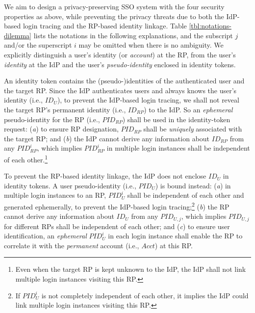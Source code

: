 We aim to design a privacy-preserving SSO system with the four security properties as above,
    while preventing the privacy threats due to both the IdP-based login tracing and the RP-based identity linkage.
Table \ref{tbl:notations-dilemma} lists the notations in the following explanations,
    and the subscript $j$ and/or the superscript $i$ may be omitted when there is no ambiguity.
We explicitly distinguish a user's identity (or \emph{account}) at the RP, 
     from the user's \emph{identity} at the IdP and the user's \emph{pseudo-identity} enclosed in identity tokens.

An identity token contains the (pseudo-)identities of the authenticated user and the target RP. %
Since the IdP authenticates users and always knows the user's identity (i.e., $ID_U$),
    to prevent the IdP-based login tracing,
    we shall not reveal the target RP's permanent identity (i.e., $ID_{RP}$) to the IdP.
So an \emph{ephemeral} pseudo-identity for the RP (i.e., $PID_{RP}$) shall be used in the identity-token request:
(\emph{a}) to ensure RP designation,
     $PID_{RP}$ shall be \emph{uniquely} associated with the target RP;
    and (\emph{b}) the IdP cannot derive any information about $ID_{RP}$ from any $PID_{RP}^i$,
        which implies $PID_{RP}^i$ in multiple login instances shall
         be independent of each other.\footnote{Even when the target RP is kept unknown to the IdP,
            the IdP shall not link multiple login instances visiting this RP.}

To prevent the RP-based identity linkage,
 the IdP does not enclose $ID_U$ in identity tokens.
A user pseudo-identity (i.e., $PID_U$) is bound instead:
    (\emph{a}) in multiple login instances to an RP, $PID_U^i$ shall be independent of each other and generated ephemerally,
        to prevent the IdP-based login tracing;\footnote{If $PID_U^i$ is not completely independent of each other,
         it implies the IdP could link multiple login instances visiting this RP.}
    (\emph{b}) the RP cannot derive any information about $ID_U$ from any $PID_{U,j}$,
    which implies $PID_{U,j}$ for different RPs shall be independent of each other;
    and (\emph{c}) to ensure user identification,
    an \emph{ephemeral} $PID_{U}^i$ in each login instance shall enable the RP to correlate it
     with the \emph{permanent} account  (i.e., $Acct$) at this RP.


